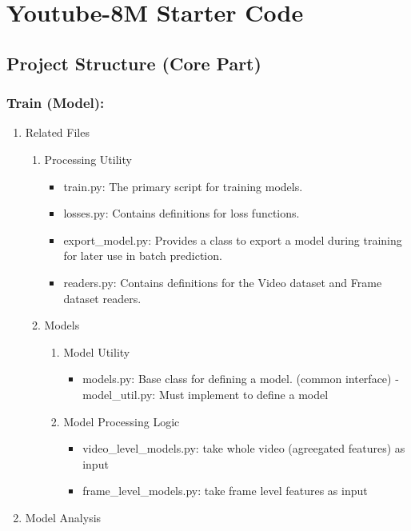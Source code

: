 \documentclass[11pt]{article}
\author{Jing-jiang Li}
\date{\today}
\title{}
\begin{document}
\tableofcontents

\section{Youtube-8M Starter Code}
\label{sec:org7447352}

\subsection{Project Structure (Core Part)}
\label{sec:org95d6e78}

\subsubsection{Train (Model):}
\label{sec:org18064e6}

\begin{enumerate}
\item Related Files
\label{sec:org56e608b}

\begin{enumerate}
\item Processing Utility
\label{sec:orgf7330cb}
\begin{itemize}
\item train.py: The primary script for training models.
\item losses.py: Contains definitions for loss functions.
\item export\_model.py: Provides a class to export a model during training for later use in batch prediction.
\item readers.py: Contains definitions for the Video dataset and Frame dataset readers.
\end{itemize}
\item Models
\label{sec:org093eab1}
\begin{enumerate}
\item Model Utility
\label{sec:orgb53df69}
\begin{itemize}
\item models.py: Base class for defining a model. (common interface) - model\_util.py: Must implement to define a model
\end{itemize}
\item Model Processing Logic
\label{sec:org5d3e38f}
\begin{itemize}
\item video\_level\_models.py: take whole video (agreegated features) as input
\item frame\_level\_models.py: take frame level features as input
\end{itemize}
\end{enumerate}
\end{enumerate}
\item Model Analysis
\label{sec:org47974d4}


\end{enumerate}
\end{document}
